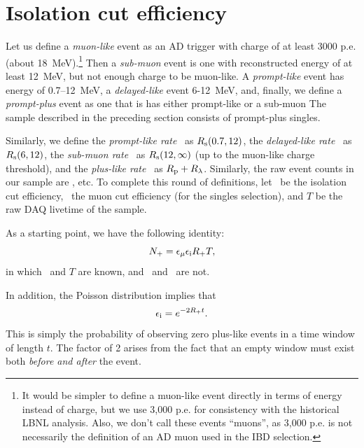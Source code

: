 \documentclass[../thesis.tex]{subfiles}
\begin{document}
\section{Isolation cut efficiency}
\label{sec:isolcuteff}

Let us define a \emph{muon-like} event as an AD trigger with charge of at least
3000 p.e. (about 18~MeV).\footnote{It would be simpler to define a muon-like
  event directly in terms of energy instead of charge, but we use 3,000 p.e. for
  consistency with the historical LBNL analysis. Also, we don't call these
  events ``muons'', as 3,000 p.e. is not necessarily the definition of an AD
  muon used in the IBD selection.} Then a \emph{sub-muon} event is one with
reconstructed energy of at least 12~MeV, but not enough charge to be muon-like.
A \emph{prompt-like} event has energy of 0.7--12~MeV, a \emph{delayed-like}
event 6-12~MeV, and, finally, we define a \emph{prompt-plus} event as one that
is has either prompt-like or a sub-muon The sample described in the preceding
section consists of prompt-plus singles.

Similarly, we define the \emph{prompt-like rate} \Rpro\ as $R_\mathrm{s}(0.7, 12)$, the \emph{delayed-like rate} \Rdel\ as $R_\mathrm{s}(6, 12)$, the \emph{sub-muon rate} \Rsub\ as $R_\mathrm{s}(12, \infty)$ (up to the muon-like charge threshold), and the \emph{plus-like rate} \Rplu\ as $R_\mathrm{p} + R_\mathrm{\lambda}$. Similarly, the raw event counts in our sample are \Npro, etc. To complete this round of definitions, let \eisol\ be the isolation cut efficiency, \emu\ the muon cut efficiency (for the singles selection), and $T$ be the raw DAQ livetime of the sample.

As a starting point, we have the following identity:
\begin{equation}
  \label{eq:ident0}
  N_\mathrm{+} = \epsilon_\mathrm{\mu} \epsilon_\mathrm{i} R_\mathrm{+} T,
\end{equation}
in which \emu\ and $T$ are known, and \eisol\ and \Rplu\ are not.

In addition, the Poisson distribution implies that
\begin{equation}
  \label{eq:ident1}
  \epsilon_\mathrm{i} = e^{-2R_\mathrm{+} t}.
\end{equation}
This is simply the probability of observing zero plus-like events in a time window of length $t$. The factor of 2 arises from the fact that an empty window must exist both \emph{before and after} the event.
\end{document}
